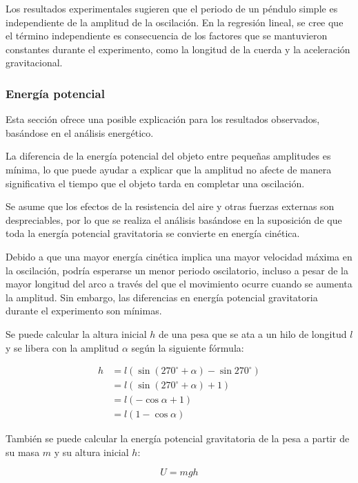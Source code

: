 \documentclass[twocolumn]{article}
\numberwithin{table}{section}
\begin{document}
Los resultados experimentales sugieren que el periodo de un péndulo simple es
independiente de la amplitud de la oscilación. En la regresión lineal, se cree
que el término independiente es consecuencia de los factores que se mantuvieron
constantes durante el experimento, como la longitud de la cuerda y la
aceleración gravitacional.

\subsubsection{Energía potencial}

Esta sección ofrece una posible explicación para los resultados
observados, basándose en el análisis energético.

La diferencia de la energía potencial del objeto entre pequeñas amplitudes
es mínima, lo que puede ayudar a explicar que la amplitud no afecte de manera
significativa el tiempo que el objeto tarda en completar una oscilación.

Se asume que los efectos de la resistencia del aire y otras fuerzas
externas son despreciables, por lo que se realiza el análisis
basándose en la suposición de que toda la energía potencial gravitatoria
se convierte en energía cinética.

Debido a que una mayor energía cinética implica una mayor velocidad
máxima en la oscilación, podría esperarse un menor periodo
oscilatorio, incluso a pesar de la mayor longitud del arco a través
del que el movimiento ocurre cuando se aumenta la amplitud. Sin
embargo, las diferencias en energía potencial gravitatoria durante
el experimento son mínimas.

Se puede calcular la altura inicial $h$ de una pesa que se ata a un hilo de
longitud $l$ y se libera con la amplitud $\alpha$ según la siguiente fórmula:

\begin{align}
  h &= l(\sin{(270^{\circ} + \alpha)} - \sin{270^{\circ}}) \nonumber \\
  &= l(\sin{(270^{\circ} + \alpha)} + 1) \nonumber \\
  &= l(-\cos{\alpha} + 1) \nonumber \\
  &= l(1 - \cos{\alpha})
\end{align}

También se puede calcular la energía potencial gravitatoria de la pesa
a partir de su masa $m$ y su altura inicial $h$:

\begin{equation}
  U = mgh
\end{equation}
\end{document}
